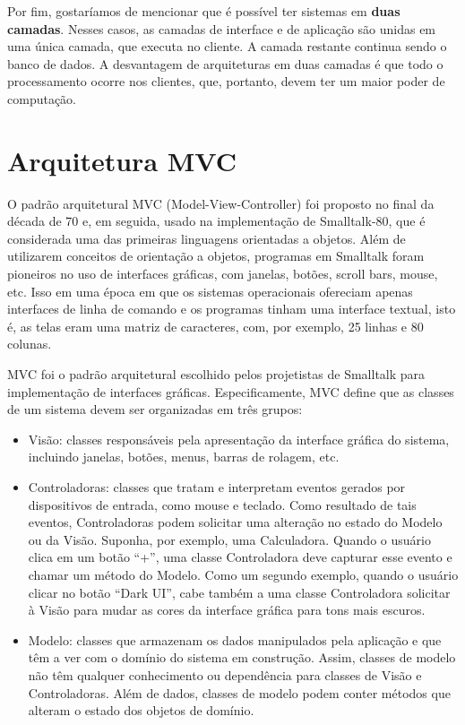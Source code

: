 \documentclass[
  11pt,
  twoside]{book}
\begin{document}
 Por fim, gostaríamos de
mencionar que é possível ter sistemas em \textbf{duas camadas}. Nesses
casos, as camadas de interface e de aplicação são unidas em uma única
camada, que executa no cliente. A camada restante continua sendo o banco
de dados. A desvantagem de arquiteturas em duas camadas é que todo o
processamento ocorre nos clientes, que, portanto, devem ter um maior
poder de computação.

\hypertarget{arquitetura-mvc}{%
\section{Arquitetura MVC}\label{arquitetura-mvc}}


O padrão arquitetural MVC (Model-View-Controller) foi proposto no final
da década de 70 e, em seguida, usado na implementação de Smalltalk-80,
que é considerada uma das primeiras linguagens orientadas a objetos.
Além de utilizarem conceitos de orientação a objetos, programas em
Smalltalk foram pioneiros no uso de interfaces gráficas, com janelas,
botões, scroll bars, mouse, etc. Isso em uma época em que os sistemas
operacionais ofereciam apenas interfaces de linha de comando e os
programas tinham uma interface textual, isto é, as telas eram uma matriz
de caracteres, com, por exemplo, 25 linhas e 80 colunas.

 MVC foi o padrão arquitetural escolhido pelos
projetistas de Smalltalk para implementação de interfaces gráficas.
Especificamente, MVC define que as classes de um sistema devem ser
organizadas em três grupos:

\begin{itemize}
\item
  Visão: classes responsáveis pela apresentação da interface gráfica do
  sistema, incluindo janelas, botões, menus, barras de rolagem, etc.
\item
  Controladoras: classes que tratam e interpretam eventos gerados por
  dispositivos de entrada, como mouse e teclado. Como resultado de tais
  eventos, Controladoras podem solicitar uma alteração no estado do
  Modelo ou da Visão. Suponha, por exemplo, uma Calculadora. Quando o
  usuário clica em um botão ``+'', uma classe Controladora deve capturar
  esse evento e chamar um método do Modelo. Como um segundo exemplo,
  quando o usuário clicar no botão ``Dark UI'', cabe também a uma classe
  Controladora solicitar à Visão para mudar as cores da interface
  gráfica para tons mais escuros.
\item
  Modelo: classes que armazenam os dados manipulados pela aplicação e
  que têm a ver com o domínio do sistema em construção. Assim, classes
  de modelo não têm qualquer conhecimento ou dependência para classes de
  Visão e Controladoras. Além de dados, classes de modelo podem conter
  métodos que alteram o estado dos objetos de domínio.
\end{itemize}
\end{document}
